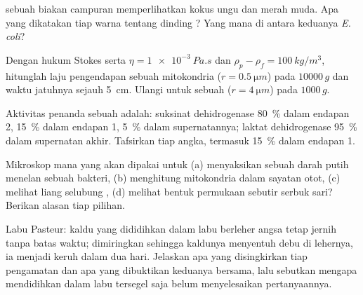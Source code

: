 \begin{exercise}[$\star\star$]\label{exo:b1:cell-unit-of-life:6}
 sebuah biakan campuran memperlihatkan kokus ungu dan
 merah muda. Apa yang dikatakan tiap warna tentang dinding ?
Yang mana di antara keduanya \emph{E. coli}?
\end{exercise}

\begin{exercise}[$\star\star$]\label{exo:b1:cell-unit-of-life:7}
Dengan hukum Stokes serta $\eta = \qty{1e-3}{Pa.s}$ dan $\rho_p - \rho_f =
\qty{100}{kg/m^3}$, hitunglah laju pengendapan sebuah mitokondria
($r = \qty{0.5}{\micro m}$) pada $\num{10000}\,g$ dan waktu jatuhnya
sejauh \qty{5}{cm}. Ulangi untuk sebuah  ($r = \qty{4}{\micro m}$)
pada
$1000\,g$.
\end{exercise}

\begin{exercise}[$\star\star$]\label{exo:b1:cell-unit-of-life:8}
Aktivitas penanda sebuah  adalah: suksinat dehidrogenase
\qty{80}{\%} dalam endapan 2, \qty{15}{\%} dalam endapan 1, \qty{5}{\%}
dalam supernatannya; laktat dehidrogenase \qty{95}{\%} dalam supernatan
akhir. Tafsirkan tiap angka, termasuk \qty{15}{\%} dalam endapan 1.
\end{exercise}

\begin{exercise}[$\star\star$]\label{exo:b1:cell-unit-of-life:9}
Mikroskop mana yang akan dipakai untuk (a) menyaksikan sebuah  darah
putih menelan sebuah bakteri, (b) menghitung mitokondria dalam sayatan
otot, (c) melihat liang selubung , (d) melihat bentuk permukaan
sebutir serbuk sari? Berikan alasan tiap pilihan.
\end{exercise}

\begin{exercise}[$\star\star\star$]\label{exo:b1:cell-unit-of-life:10}
Labu Pasteur: kaldu yang dididihkan dalam labu berleher angsa tetap
jernih tanpa batas waktu; dimiringkan sehingga kaldunya menyentuh debu
di lehernya, ia menjadi keruh dalam dua hari. Jelaskan apa yang
disingkirkan tiap pengamatan dan apa yang dibuktikan keduanya bersama,
lalu sebutkan mengapa mendidihkan dalam labu tersegel saja belum
menyelesaikan pertanyaannya.
\end{exercise}

